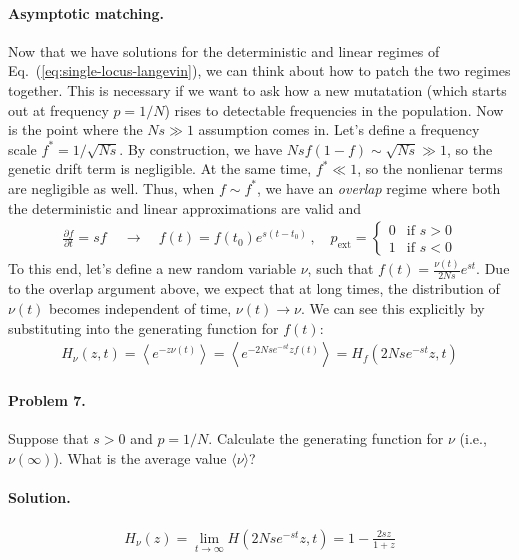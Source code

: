 \documentclass[11pt]{article}
\newcommand{\eq}[1]{Eq.~(\ref{#1})}
\begin{document}
\paragraph{Asymptotic matching.}  Now that we have solutions for the deterministic and linear regimes of \eq{eq:single-locus-langevin}, we can think about how to patch the two regimes together. This is necessary if we want to ask how a new mutatation (which starts out at frequency $p=1/N$) rises to detectable frequencies in the population. Now is the point where the $Ns \gg 1$ assumption comes in. Let's define a frequency scale $f^* = 1/\sqrt{Ns}$. By construction, we have $Ns f(1-f) \sim \sqrt{Ns} \gg 1$, so the genetic drift term is negligible. At the same time, $f^* \ll 1$, so the nonlienar terms are negligible as well. Thus, when $f \sim f^*$, we have an \emph{overlap} regime where both the deterministic and linear approximations are valid and
\begin{align}
\frac{\partial f}{\partial t} = s f \, \quad \to \quad f(t) = f(t_0) e^{s(t-t_0)}  \, , \quad p_\mathrm{ext} = \begin{cases}
0 & \text{if $s > 0$} \\
1 & \text{if $s < 0$}
\end{cases}
\end{align}
To this end, let's define a new random variable $\nu$, such that $f(t) = \frac{\nu(t)}{2Ns} e^{st}$. Due to the overlap argument above, we expect that at long times, the distribution of $\nu(t)$ becomes independent of time, $\nu(t) \to \nu$. We can see this explicitly by substituting into the generating function for $f(t)$:
\begin{align}
H_{\nu}(z,t) = \left\langle e^{-z \nu(t)} \right\rangle = \left\langle e^{-2Ns e^{-st} z f(t)} \right\rangle = H_f(2Nse^{-st}z,t) 
\end{align}

\paragraph{Problem 7.} Suppose that $s > 0$ and $p=1/N$. Calculate the generating function for $\nu$ (i.e., $\nu(\infty)$). What is the average value $\langle \nu \rangle$?

\paragraph{Solution.}  
\begin{align}
H_\nu(z) = \lim_{t \to \infty} H(2 Ns e^{-st} z ,t) = 1 - \frac{2s z}{1+z}  
\end{align}
\end{document}
